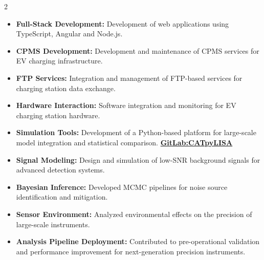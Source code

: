 \documentclass[8pt,a4paper,ragged2e,withhyper]{../_shared/altacv}
\begin{document}
\begin{paracol}{2}
\begin{itemize}
\item \textbf{Full-Stack Development:} Development of web applications using TypeScript, Angular and Node.js.
\item \textbf{CPMS Development:} Development and maintenance of CPMS services for EV charging infrastructure.
\item \textbf{FTP Services:} Integration and management of FTP-based services for charging station data exchange.
\item \textbf{Hardware Interaction:} Software integration and monitoring for EV charging station hardware.
\end{itemize}
\divider
{}
\begin{itemize}
\item \textbf{Simulation Tools:} Development of a Python-based platform for large-scale model integration and statistical comparison. \textcolor{DarkPastelRed}{\href{https://gitlab.oca.eu/gboileau/lisa_l3_tools}{\bf GitLab:CATpyLISA}}
\item \textbf{Signal Modeling:}  Design and simulation of low-SNR background signals for advanced detection systems.
\end{itemize}
\divider
{}
\begin{itemize}
\item \textbf{Bayesian Inference:} Developed MCMC pipelines for noise source identification and mitigation.
\item \textbf{Sensor Environment:} Analyzed environmental effects on the precision of large-scale instruments.

\item \textbf{Analysis Pipeline Deployment:} Contributed to pre-operational validation and performance improvement for next-generation precision instruments.


\end{itemize}
\end{paracol}
\end{document}
